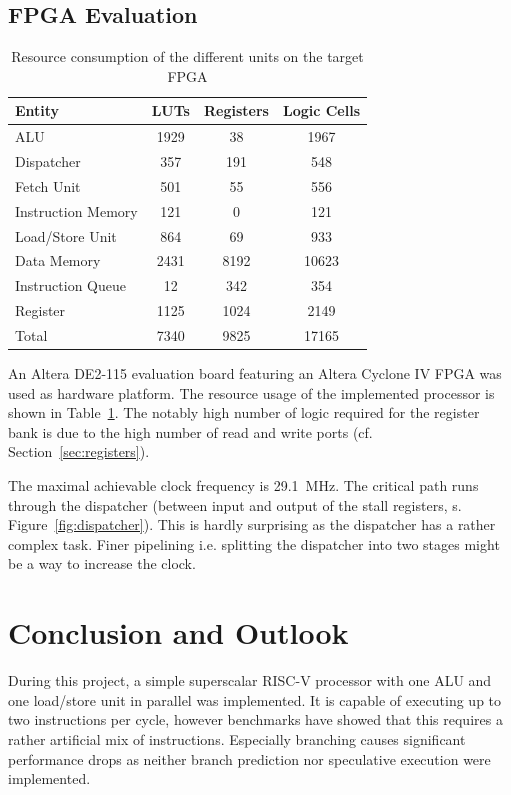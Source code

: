 \documentclass[conference]{IEEEtran}
\begin{document}
\subsection{FPGA Evaluation}

\begin{table}
	\caption{Resource consumption of the different units on the target FPGA}
	\centering
	\begin{tabular}{l c c c}
			Entity & LUTs & Registers & Logic Cells \\
		\midrule
			ALU & 1929 & 38 & 1967 \\
			Dispatcher & 357 & 191 & 548 \\
			Fetch Unit & 501 & 55 & 556 \\
			Instruction Memory & 121 & 0 & 121 \\
			Load/Store Unit & 864 & 69 & 933 \\
			Data Memory & 2431 & 8192 & 10623 \\
			Instruction Queue & 12 & 342 & 354 \\
			Register & 1125 & 1024 & 2149 \\
		\midrule
			Total & 7340 & 9825 & 17165 \\
	\end{tabular}
	\label{tab:resources}
\end{table}

An Altera DE2-115 evaluation board featuring an Altera Cyclone IV FPGA was used as hardware platform. The resource usage of the implemented processor is shown in Table~\ref{tab:resources}. 
The notably high number of logic required for the register bank is due to the high number of read and write ports (cf. Section~\ref{sec:registers}).

The maximal achievable clock frequency is \SI{29.1}{\MHz}. The critical path runs through the dispatcher (between input and output of the stall registers, s. Figure~\ref{fig:dispatcher}). This is hardly surprising as the dispatcher has a rather complex task. Finer pipelining i.e. splitting the dispatcher into two stages might be a way to increase the clock.

\section{Conclusion and Outlook} \label{sec:conclusion}

During this project, a simple superscalar RISC-V processor with one ALU and one load/store unit in parallel was implemented. It is capable of executing up to two instructions per cycle, however benchmarks have showed that this requires a rather artificial mix of instructions. Especially branching causes significant performance drops as neither branch prediction nor speculative execution were implemented.
\end{document}
